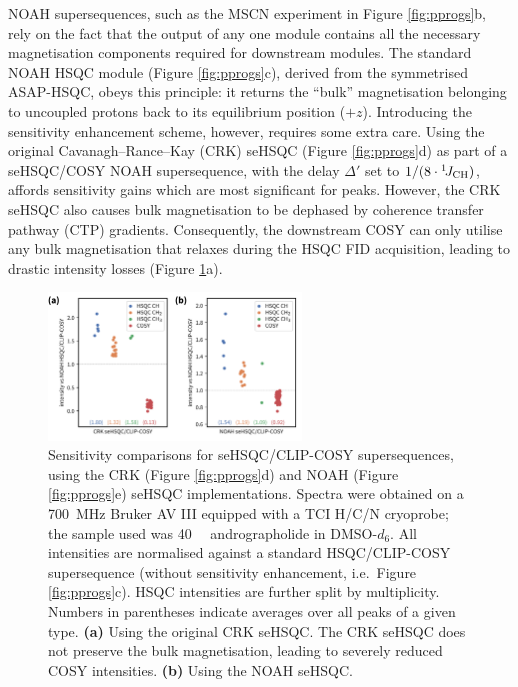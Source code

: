 \documentclass[11pt]{article}
\newcommand*{\onejch}{{}^{1}\!J_{\ce{CH}}}
\newcommand*{\figref}[1]{Figure \ref{fig:#1}}
\begin{document}
NOAH supersequences, such as the MSCN experiment in \figref{pprogs}b, rely on the fact that the output of any one module contains all the necessary magnetisation components required for downstream modules.
The standard NOAH HSQC module (\figref{pprogs}c), derived from the symmetrised ASAP-HSQC,\autocite{asaphsqc} obeys this principle: it returns the ``bulk'' magnetisation belonging to uncoupled protons back to its equilibrium position ($+z$).
Introducing the sensitivity enhancement scheme, however, requires some extra care.
Using the original Cavanagh--Rance--Kay (CRK) seHSQC (\figref{pprogs}d) as part of a seHSQC/COSY NOAH supersequence, with the delay $\Delta'$ set to $1/(8 \cdot \onejch)$, affords sensitivity gains which are most significant for  peaks.\autocite{sehsqc_sens}
However, the CRK seHSQC also causes bulk magnetisation to be dephased by coherence transfer pathway (CTP) gradients.
Consequently, the downstream COSY can only utilise any bulk magnetisation that relaxes during the HSQC FID acquisition, leading to drastic intensity losses (\figref{spor_spv2}a).

\begin{figure}
    \centering
    \includegraphics[width=0.6\textwidth]{figures/spor_spv2_comp.png}
    \caption{
        Sensitivity comparisons for seHSQC/CLIP-COSY\autocite{Koos2016ACIE} supersequences, using the CRK (\figref{pprogs}d) and NOAH (\figref{pprogs}e) seHSQC implementations.
        Spectra were obtained on a \SI{700}{\MHz} Bruker AV III equipped with a TCI H/C/N cryoprobe; the sample used was \SI{40}{\milli\molar} andrographolide in DMSO-$d_6$.
        All intensities are normalised against a standard HSQC/CLIP-COSY supersequence (without sensitivity enhancement, i.e.\ \figref{pprogs}c).
        HSQC intensities are further split by multiplicity.
        Numbers in parentheses indicate averages over all peaks of a given type.
        \textbf{(a)} Using the original CRK seHSQC.
        The CRK seHSQC does not preserve the bulk magnetisation, leading to severely reduced COSY intensities.
        \textbf{(b)} Using the NOAH seHSQC.
    }
    \label{fig:spor_spv2}
\end{figure}
\end{document}
